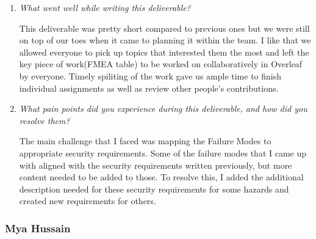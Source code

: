 \documentclass{article}
\begin{document}
\begin{enumerate}
    \item \textit{What went well while writing this deliverable?}

    This deliverable was pretty short compared to previous ones but we were still on top of our toes when it came to planning it within the team. I like that we allowed everyone to pick up topics that interested them the most and left the key piece of work(FMEA table) to be worked on collaboratively in Overleaf by everyone. Timely spiliting of the work gave us ample time to finish individual assignments as well as review other people's contributions.

    \item \textit{What pain points did you experience during this deliverable, and how did you resolve them?}

    The main challenge that I faced was mapping the Failure Modes to appropriate security requirements. Some of the failure modes that I came up with aligned with the security requirements written previously, but more content needed to be added to those. To resolve this, I added the additional description needed for these security requirements for some hazards and created new requirements for others.

\end{enumerate}

\subsubsection*{Mya Hussain}
\end{document}
